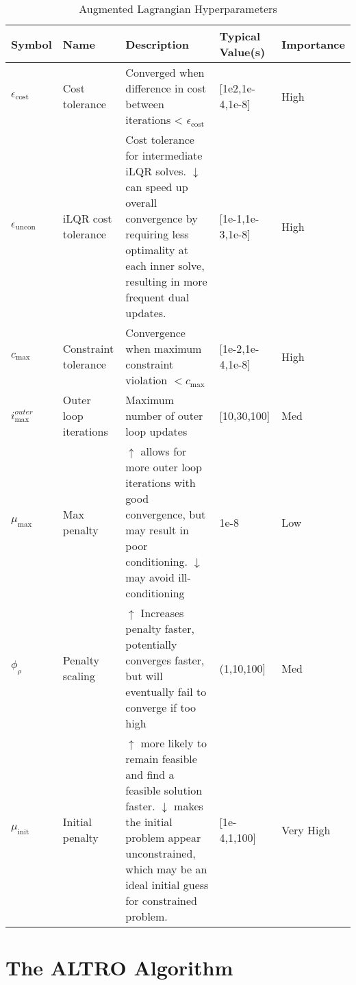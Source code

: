 \documentclass[../root.tex]{subfiles}
\begin{document}
\begin{landscape}
	\begin{table*}
        \small
		\centering
		\caption{Augmented Lagrangian Hyperparameters}
		\begin{tabular}{llp{9cm}ll}
			\toprule
			\textbf{Symbol} & \textbf{Name} & \textbf{Description} & \textbf{Typical Value(s)} & \textbf{Importance} \\
			\midrule
			$\epsilon_\text{cost}$ & Cost tolerance & Converged when difference in cost between iterations < $\epsilon_\text{cost}$ & [1e2,1e-4,1e-8] & High \\
			$\epsilon_\text{uncon}$ & iLQR cost tolerance & Cost tolerance for intermediate iLQR solves. $\downarrow$ can speed up overall convergence by requiring less optimality at each inner solve, resulting in more frequent dual updates. & [1e-1,1e-3,1e-8] & High \\
			
			$c_\text{max}$ & Constraint tolerance & Convergence when maximum constraint violation $< c_\text{max}$ & [1e-2,1e-4,1e-8] & High \\
			
			$i_\text{max}^{outer}$ & Outer loop iterations & Maximum number of outer loop updates & [10,30,100] & Med \\
			
			$\mu_\text{max}$ & Max penalty & $\uparrow$ allows for more outer loop iterations with good convergence, but may result in poor conditioning. $\downarrow$ may avoid ill-conditioning & 1e-8 & Low \\
			
			$\phi_\rho$ & Penalty scaling & $\uparrow$ Increases penalty faster, potentially converges faster, but will eventually fail to converge if too high & (1,10,100] & Med \\
			
			$\mu_\text{init}$ & Initial penalty & $\uparrow$ more likely to remain feasible and find a feasible solution faster. $\downarrow$ makes the initial problem appear unconstrained, which may be an ideal initial guess for constrained problem. & [1e-4,1,100] & Very High \\
			
			\toprule
		\end{tabular}
		\label{tab:al_params}
	\end{table*}
    \end{landscape}


\section{The ALTRO Algorithm} 
\end{document}

